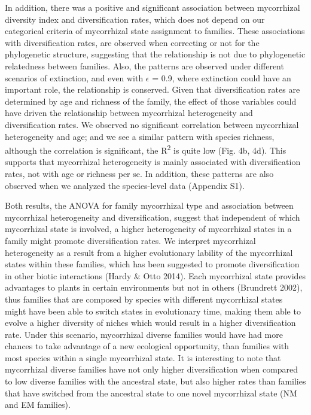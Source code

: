 \documentclass[12pt,]{article}
\begin{document}
In addition, there was a positive and significant association between
mycorrhizal diversity index and diversification rates, which does not
depend on our categorical criteria of mycorrhizal state assignment to
families. These associations with diversification rates, are observed
when correcting or not for the phylogenetic structure, suggesting that
the relationship is not due to phylogenetic relatedness between
families. Also, the patterns are observed under different scenarios of
extinction, and even with \(\epsilon\) = 0.9, where extinction could
have an important role, the relationship is conserved. Given that
diversification rates are determined by age and richness of the family,
the effect of those variables could have driven the relationship between
mycorrhizal heterogeneity and diversification rates. We observed no
significant correlation between mycorrhizal heterogeneity and age; and
we see a similar pattern with species richness, although the correlation
is significant, the R\textsuperscript{2} is quite low (Fig. 4b, 4d).
This supports that mycorrhizal heterogeneity is mainly associated with
diversification rates, not with age or richness per se. In addition,
these patterns are also observed when we analyzed the species-level data
(Appendix S1).

Both results, the ANOVA for family mycorrhizal type and association
between mycorrhizal heterogeneity and diversification, suggest that
independent of which mycorrhizal state is involved, a higher
heterogeneity of mycorrhizal states in a family might promote
diversification rates. We interpret mycorrhizal heterogeneity as a
result from a higher evolutionary lability of the mycorrhizal states
within these families, which has been suggested to promote
diversification in other biotic interactions (Hardy \& Otto 2014). Each
mycorrhizal state provides advantages to plants in certain environments
but not in others (Brundrett 2002), thus families that are composed by
species with different mycorrhizal states might have been able to switch
states in evolutionary time, making them able to evolve a higher
diversity of niches which would result in a higher diversification rate.
Under this scenario, mycorrhizal diverse families would have had more
chances to take advantage of a new ecological opportunity, than families
with most species within a single mycorrhizal state. It is interesting
to note that mycorrhizal diverse families have not only higher
diversification when compared to low diverse families with the ancestral
state, but also higher rates than families that have switched from the
ancestral state to one novel mycorrhizal state (NM and EM families).
\end{document}
